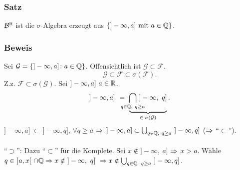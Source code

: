 \subsubsection{Satz}
$\mathcal{B}^{\mathbb{R}}$ ist die $\sigma$-Algebra erzeugt aus $\{]-\infty,a]\ \text{mit}\ a\in\QQ\}$.
\subsubsection{Beweis}
Sei $\mathcal{G}=\{]-\infty,a]\colon a\in\mathbb{Q}\}$. Offensichtlich ist $\mathcal{G}\subset\mathcal{F}$.
\[\mathcal{G}\subset\mathcal{F}\subset\sigma(\mathcal{F}).\]
Z.z. $\mathcal{F}\subset\sigma(\mathcal{G})$. Sei $]-\infty,a]\ a\in\mathbb{R}$.
\[]-\infty,a]\ =\ \ubr{\bigcap_{\mathclap{q\in\QQ,\ q\geq a}}\ ]-\infty,\ q]}{$\in\sigma(\mathcal{G})$}.\]
$]-\infty,a]\ \subset\ ]-\infty,q]$, $\forall q\geq a$ $\Rightarrow$ $]-\infty,a]\subset\bigcup_{q\in\QQ,\ q\geq a}\ ]-\infty,q]$ ($\Rightarrow$ ``$\subset$'').
\\~\\
``$\supset$'': Dazu ``$\subset$'' f\"ur die Komplete. Sei $x\notin]-\infty,\ a]$ $\Rightarrow$ $x>a$. W\"ahle $q\in\ ]a,x[\ \cap\QQ\RA x\notin\ ]-\infty,\ q]\ \RA x\notin\bigcup_{q\in\QQ,\ q\geq a}\ ]-\infty,q]$.
